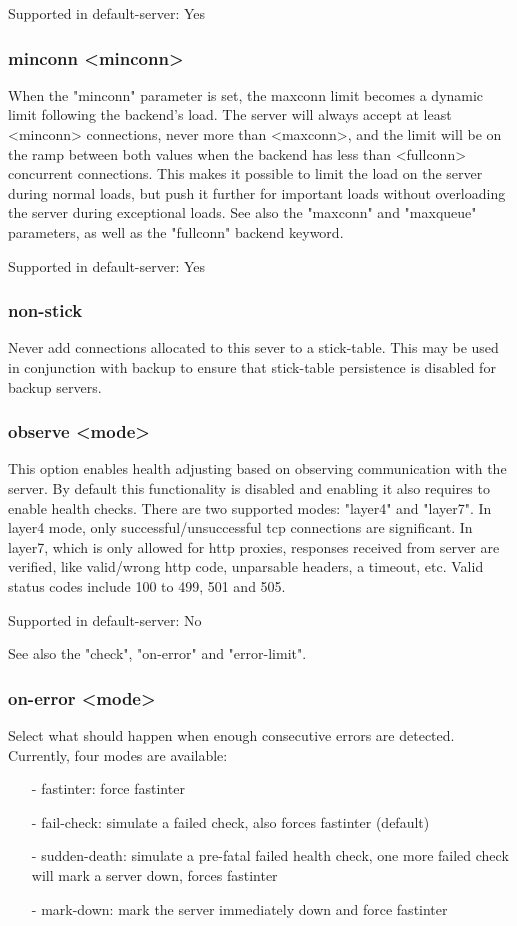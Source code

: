   Supported in default-server: Yes

\subsubsection[minconn]{minconn <minconn>}
  When the "minconn" parameter is set, the maxconn limit becomes a dynamic
  limit following the backend's load. The server will always accept at least
  <minconn> connections, never more than <maxconn>, and the limit will be on
  the ramp between both values when the backend has less than <fullconn>
  concurrent connections. This makes it possible to limit the load on the
  server during normal loads, but push it further for important loads without
  overloading the server during exceptional loads. See also the "maxconn"
  and "maxqueue" parameters, as well as the "fullconn" backend keyword.

  Supported in default-server: Yes

\subsubsection[non-stick]{non-stick}
  Never add connections allocated to this sever to a stick-table.
  This may be used in conjunction with backup to ensure that
  stick-table persistence is disabled for backup servers.

\subsubsection[observe]{observe <mode>}
  This option enables health adjusting based on observing communication with
  the server. By default this functionality is disabled and enabling it also
  requires to enable health checks. There are two supported modes: "layer4" and
  "layer7". In layer4 mode, only successful/unsuccessful tcp connections are
  significant. In layer7, which is only allowed for http proxies, responses
  received from server are verified, like valid/wrong http code, unparsable
  headers, a timeout, etc. Valid status codes include 100 to 499, 501 and 505.

  Supported in default-server: No

  See also the "check", "on-error" and "error-limit".

\subsubsection[on-error]{on-error <mode>}
  Select what should happen when enough consecutive errors are detected.
  Currently, four modes are available:
  \begin{itemize}
  \item[-] fastinter: force fastinter
  \item[-] fail-check: simulate a failed check, also forces fastinter (default)
  \item[-] sudden-death: simulate a pre-fatal failed health check, one more failed
    check will mark a server down, forces fastinter
  \item[-] mark-down: mark the server immediately down and force fastinter
  \end{itemize}

